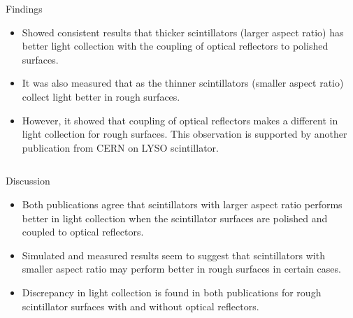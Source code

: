 \documentclass[xcolor=x11names, compress, handout]{beamer}
\renewcommand{\(}{\begin{columns}}
\renewcommand{\)}{\end{columns}}
\newcommand{\<}[1]{\begin{column}{#1}}
\renewcommand{\>}{\end{column}}
\begin{document}
\begin{frame}
\begin{columns}
\begin{column}{0.39\textwidth}
\begin{block}{Findings}
\begin{itemize}
\item Showed consistent results that thicker scintillators (larger aspect ratio) has better light collection with the coupling of optical reflectors to polished surfaces. 
\item It was also measured that as the thinner scintillators (smaller aspect ratio) collect light better in rough surfaces. 
\item However, it showed that coupling of optical reflectors makes a different in light collection for rough surfaces. This observation is supported by another publication from CERN on LYSO scintillator. \cite{pauwels_2012}
\end{itemize}
\end{block}
\end{column}
\end{columns}
\end{frame}

\begin{frame}
\scriptsize
\begin{block}{Discussion}
\begin{itemize}
\item Both publications agree that scintillators with larger aspect ratio performs better in light collection when the scintillator surfaces are polished and coupled to optical reflectors.
\item Simulated and measured results seem to suggest that scintillators with smaller aspect ratio may perform better in rough surfaces in certain cases.
\item Discrepancy in light collection is found in both publications for rough scintillator surfaces with and without optical reflectors.
\end{itemize}
\end{block}
\end{frame}
\end{document}
